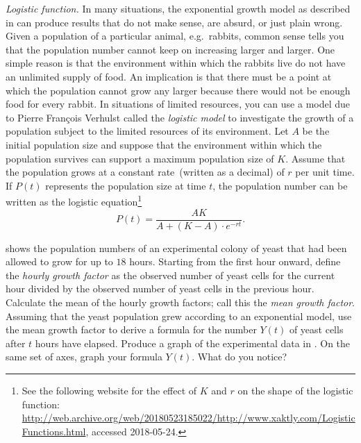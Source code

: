 \documentclass[a4paper,oneside,12pt]{article}
\begin{document}
\begin{problem}
\begin{table}[!htbp]
\centering

\caption{%
  The observed population size in an experimental colony of yeast.
  The data are due to T.~Carlson, published in~1913.  The ``Hour''
  column lists the number of hours that the population had been
  allowed to grow.  The ``Observed'' column lists the count of the
  number of yeast cells that were found in the colony after a given
  number of hours.
}
\label{tab:yeast}
\end{table}

\item\emph{Logistic function.}
  In many situations, the exponential growth model as described
  in  can produce results that do not
  make sense, are absurd, or just plain wrong.  Given a population of
  a particular animal, e.g.~rabbits, common sense tells you that the
  population number cannot keep on increasing larger and larger.  One
  simple reason is that the environment within which the rabbits live
  do not have an unlimited supply of food.  An implication is that
  there must be a point at which the population cannot grow any larger
  because there would not be enough food for every rabbit.  In
  situations of limited resources, you can use a model due to Pierre
  Fran\c{c}ois Verhulst called the \emph{logistic model} to
  investigate the growth of a population subject to the limited
  resources of its environment.  Let $A$ be the initial population
  size and suppose that the environment within which the population
  survives can support a maximum population size of $K$.  Assume that
  the population grows at a constant rate~(written as a decimal) of
  $r$ per unit time.  If $P(t)$ represents the population size at time
  $t$, the population number can be written as the logistic
  equation\footnote{
    See the following website for the effect of $K$ and $r$ on the
    shape of the logistic function:
    \url{http://web.archive.org/web/20180523185022/http://www.xaktly.com/LogisticFunctions.html},
    accessed 2018-05-24.
  }
  \begin{equation}
  \label{eqn:logistic_equation}
  P(t)
  =
  \frac{
    AK
  }{
    A + (K - A) \cdot e^{-rt}
  }.
  \end{equation}
  \begin{packedenum}
  \item\label{subprob:yeast_data_mean_growth_factor}
     shows the population numbers of an experimental
    colony of yeast that had been allowed to grow for up to $18$
    hours.  Starting from the first hour onward, define the
    \emph{hourly growth factor} as the observed number of yeast cells
    for the current hour divided by the observed number of yeast cells
    in the previous hour.  Calculate the mean of the hourly growth
    factors; call this the \emph{mean growth factor}.  Assuming that
    the yeast population grew according to an exponential model, use
    the mean growth factor to derive a formula for the number $Y(t)$
    of yeast cells after $t$ hours have elapsed.  Produce a graph of
    the experimental data in .  On the same set of
    axes, graph your formula $Y(t)$.  What do you notice?


\end{packedenum}
\end{problem}
\end{document}
